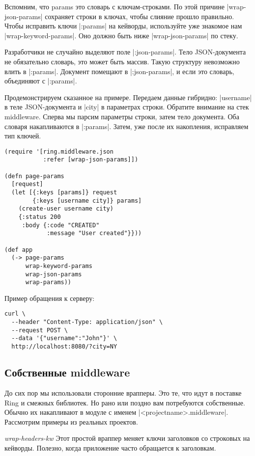 Вспомним, что params это словарь с ключам-строками. По этой причине
\spverb|wrap-json-params| сохраняет строки в ключах, чтобы слияние прошло
правильно. Чтобы исправить ключи \spverb|:params| на кейворды, используйте уже знакомое
нам \spverb|wrap-keyword-params|. Оно должно быть ниже \spverb|wrap-json-params| по стеку.

Разработчики не случайно выделяют поле \spverb|:json-params|. Тело JSON-документа не
обязательно словарь, это может быть массив. Такую структуру невозможно влить в
\spverb|:params|. Документ помещают в \spverb|:json-params|, и если это словарь, объединяют с
\spverb|:params|.

Продемонстрируем сказанное на примере. Передаем данные гибридно: \spverb|username| в
теле JSON-документа и \spverb|city| в параметрах строки. Обратите внимание на стек
middleware. Сперва мы парсим параметры строки, затем тело документа. Оба словаря
накапливаются в \spverb|:params|. Затем, уже после их накопления, исправляем тип
ключей.

\begin{verbatim}
(require '[ring.middleware.json
           :refer [wrap-json-params]])

(defn page-params
  [request]
  (let [{:keys [params]} request
        {:keys [username city]} params]
    (create-user username city)
    {:status 200
     :body {:code "CREATED"
            :message "User created"}}))

(def app
  (-> page-params
      wrap-keyword-params
      wrap-json-params
      wrap-params))
\end{verbatim}

Пример обращения к серверу:

\begin{verbatim}
curl \
  --header "Content-Type: application/json" \
  --request POST \
  --data '{"username":"John"}' \
  http://localhost:8080/?city=NY
\end{verbatim}

\subsection{Собственные middleware}

До сих пор мы использовали сторонние врапперы. Это те, что идут в поставке Ring
и смежных библиотек. Но рано или поздно вам потребуются собственные. Обычно их
накапливают в модуле с именем \spverb|<projectname>.middleware|. Рассмотрим примеры из
реальных проектов.

\emph{wrap-headers-kw} Этот простой враппер меняет ключи заголовков со строковых
на кейворды. Полезно, когда приложение часто обращается к заголовкам.

